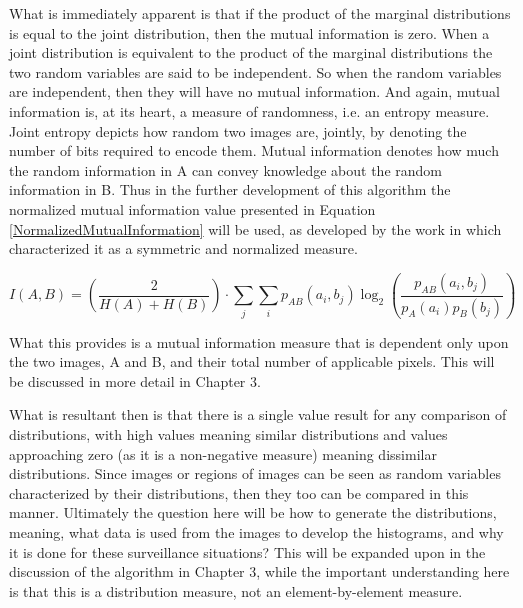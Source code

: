 \noindent What is immediately apparent is that if the product of the marginal distributions is equal to the joint distribution, then the mutual information is zero. When a joint distribution is equivalent to the product of the marginal distributions the two random variables are said to be independent. So when the random variables are independent, then they will have no mutual information. And again, mutual information is, at its heart, a measure of randomness, i.e. an entropy measure. Joint entropy depicts how random two images are, jointly, by denoting the number of bits required to encode them. Mutual information denotes how much the random information in A can convey knowledge about the random information in B. Thus in the further development of this algorithm the normalized mutual information value presented in Equation \ref{NormalizedMutualInformation} will be used, as developed by the work in \cite{Yao1999} which characterized it as a symmetric and normalized measure.

\begin{equation}
\label{NormalizedMutualInformation}
	I(A,B) = \left( \frac{2}{H(A) + H(B)}\right) \cdot \sum_{j}{\sum_{i}{p_{AB}(a_{i},b_{j}) \log_{2}{\left( \frac{p_{AB}(a_{i},b_{j})}{p_{A}(a_{i})p_{B}(b_{j})}\right)}}}
\end{equation}

\noindent What this provides is a mutual information measure that is dependent only upon the two images, A and B, and their total number of applicable pixels. This will be discussed in more detail in Chapter 3.

What is resultant then is that there is a single value result for any comparison of distributions, with high values meaning similar distributions and values approaching zero (as it is a non-negative measure) meaning dissimilar distributions. Since images or regions of images can be seen as random variables characterized by their distributions, then they too can be compared in this manner. Ultimately the question here will be how to generate the distributions, meaning, what data is used from the images to develop the histograms, and why it is done for these surveillance situations? This will be expanded upon in the discussion of the algorithm in Chapter 3, while the important understanding here is that this is a distribution measure, not an element-by-element measure.



